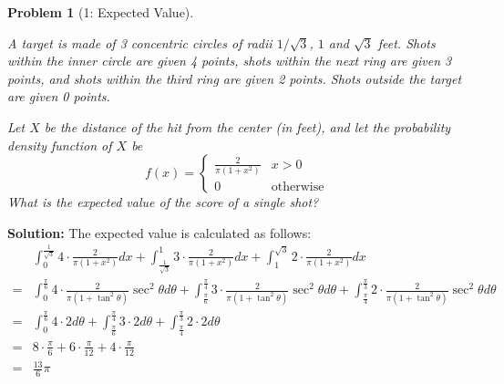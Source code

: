 \documentclass[11pt]{exam}
\theoremstyle{quest}
\newtheorem*{question}{Problem}
\begin{document}
\begin{question}[1: Expected Value]
~

A target is made of 3 concentric circles of radii $1/{\sqrt{3}}$, $1$ and
$\sqrt{3}$ feet. Shots within the inner circle are given 4 points, shots within
the next ring are given 3 points, and shots within the third ring are given 2
points. Shots outside the target are given 0 points.

Let $X$ be the distance of the hit from the center (in feet), and let the probability density function
of $X$ be
\[
f(x) =
  \begin{cases}
   \frac{2}{\pi (1+x^2)} & x>0 \\
   0 &  \text{otherwise}
  \end{cases}
\]
What is the expected value of the score of a single shot?
\end{question}
\textbf{Solution:}
The expected value is calculated as follows:
\begin{align*}
& \int_0^{\frac{1}{\sqrt{3}}}  4 \cdot \frac{2}{\pi (1+x^2)} dx + \int_{\frac{1}{\sqrt{3}}}^1  3 \cdot \frac{2}{\pi (1+x^2)} dx + \int_1^{\sqrt{3}}  2 \cdot \frac{2}{\pi (1+x^2)} dx \\
 =& \int_0^{\frac{\pi}{6}} 4 \cdot \frac{2}{\pi (1+ \tan^2 \theta)} \sec^2 \theta d\theta 
    + \int_{\frac{\pi}{6}}^{\frac{\pi}{4}} 3 \cdot \frac{2}{\pi (1+ \tan^2 \theta)} \sec^2 \theta d\theta
    +  \int_{\frac{\pi}{4}}^{\frac{\pi}{3}} 2 \cdot \frac{2}{\pi (1+ \tan^2 \theta)} \sec^2 \theta d\theta\\
 =&  \int_0^{\frac{\pi}{6}} 4 \cdot 2 d\theta 
    + \int_{\frac{\pi}{6}}^{\frac{\pi}{4}} 3 \cdot 2 d\theta
    +  \int_{\frac{\pi}{4}}^{\frac{\pi}{3}} 2 \cdot 2 d\theta\\
 =& 8 \cdot \frac{\pi}{6} + 6 \cdot \frac{\pi}{12} + 4 \cdot \frac{\pi}{12}\\
 =& \frac{13}{6} \pi
\end{align*}

\newpage

\end{document}
